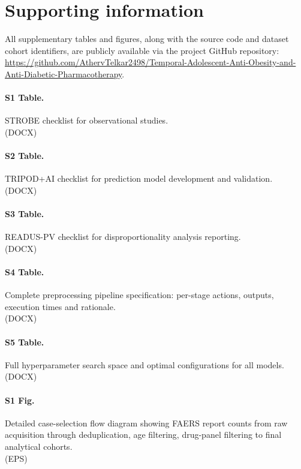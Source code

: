 \documentclass[10pt]{article}
\begin{document}
\section*{Supporting information}

\noindent All supplementary tables and figures, along with the source code and dataset cohort identifiers, are publicly available via the project GitHub repository:\\ \url{https://github.com/AthervTelkar2498/Temporal-Adolescent-Anti-Obesity-and-Anti-Diabetic-Pharmacotherapy}.

\paragraph{S1 Table.}\label{s1tab} STROBE checklist for observational studies.\\
(DOCX)

\paragraph{S2 Table.}\label{s2tab} TRIPOD+AI checklist for prediction model development and validation.\\
(DOCX)

\paragraph{S3 Table.}\label{s3tab} READUS-PV checklist for disproportionality analysis reporting.\\
(DOCX)

\paragraph{S4 Table.}\label{s4tab} Complete preprocessing pipeline specification: per-stage actions, outputs, execution times and rationale.\\
(DOCX)

\paragraph{S5 Table.}\label{s5tab} Full hyperparameter search space and optimal configurations for all models.\\
(DOCX)

\paragraph{S1 Fig.}\label{s1fig} Detailed case-selection flow diagram showing FAERS report counts from raw acquisition through deduplication, age filtering, drug-panel filtering to final analytical cohorts.\\
(EPS)
\end{document}
